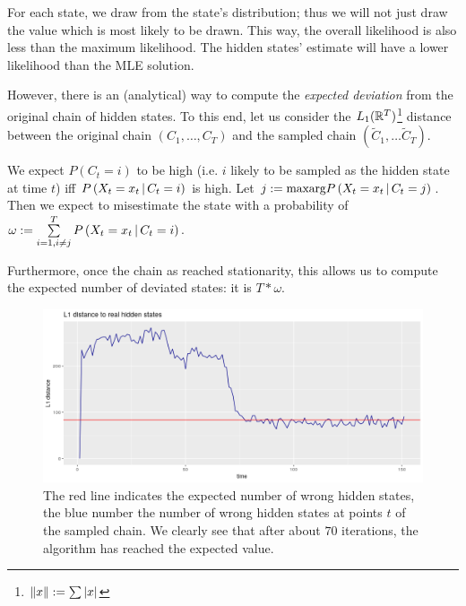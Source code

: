  For each state, we draw from the state's distribution; thus we will not just draw the value which is most likely to be drawn. This way, the overall likelihood is also less than the maximum likelihood. The hidden states' estimate will have a lower likelihood than the MLE solution. 

However, there is an (analytical) way to compute the \textit{expected deviation} from the original chain of hidden states. 
To this end, let us consider the $L_1(\mathbb{R}^T)$\footnote{$\left\lVert x\right\rVert := \sum |x|$} distance between the original chain $\left(C_1, \dots, C_T\right)$ and the sampled chain $\left(\tilde{C}_1, \dots \tilde{C}_T\right)$. 

We expect $P(C_t = i)$ to be high (i.e. $i$ likely to be sampled as the hidden state at time $t$) iff $P\left(X_t = x_t \, | \,  C_t = i\right)$ is high. Let $j := \text{maxarg} P\left(X_t = x_t \, | \, C_t = j\right)$. Then we expect to misestimate the state with a probability of $\omega := \sum\limits_{i = 1, i \neq j}^T P\left(X_t = x_t \, | \, C_t = i\right)$. 

Furthermore, once the chain as reached stationarity, this allows us to compute the expected number of deviated states: it is $ T * \omega$. 

\begin{figure}
	\includegraphics[width=\linewidth]{./img/l1_hidden_state_distance.png}
	\caption{The red line indicates the expected number of wrong hidden states, the blue number the number of wrong hidden states at points $t$ of the sampled chain. We clearly see that after about $70$ iterations, the algorithm has reached the expected value. }
	\label{l1_wrong_states}
\end{figure}









